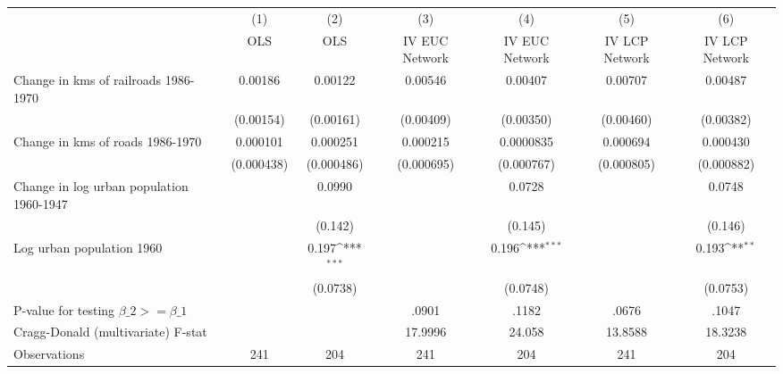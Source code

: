 {
\def\sym#1{\ifmmode^{#1}\else\(^{#1}\)\fi}
\begin{tabular}{l*{6}{c}}
\hline\hline
                &\multicolumn{1}{c}{(1)}&\multicolumn{1}{c}{(2)}&\multicolumn{1}{c}{(3)}&\multicolumn{1}{c}{(4)}&\multicolumn{1}{c}{(5)}&\multicolumn{1}{c}{(6)}\\
                &\multicolumn{1}{c}{OLS}&\multicolumn{1}{c}{OLS}&\multicolumn{1}{c}{IV EUC Network}&\multicolumn{1}{c}{IV EUC Network}&\multicolumn{1}{c}{IV LCP Network}&\multicolumn{1}{c}{IV LCP Network}\\
\hline
Change in kms of railroads 1986-1970&  0.00186         &  0.00122         &  0.00546         &  0.00407         &  0.00707         &  0.00487         \\
                &(0.00154)         &(0.00161)         &(0.00409)         &(0.00350)         &(0.00460)         &(0.00382)         \\
[1em]
Change in kms of roads 1986-1970& 0.000101         & 0.000251         & 0.000215         &0.0000835         & 0.000694         & 0.000430         \\
                &(0.000438)         &(0.000486)         &(0.000695)         &(0.000767)         &(0.000805)         &(0.000882)         \\
[1em]
Change in log urban population 1960-1947&                  &   0.0990         &                  &   0.0728         &                  &   0.0748         \\
                &                  &  (0.142)         &                  &  (0.145)         &                  &  (0.146)         \\
[1em]
Log urban population 1960&                  &    0.197\sym{***}&                  &    0.196\sym{***}&                  &    0.193\sym{**} \\
                &                  & (0.0738)         &                  & (0.0748)         &                  & (0.0753)         \\
\hline
P-value for testing $\beta\_{2} >= \beta\_{1}$&                  &                  &    .0901         &    .1182         &    .0676         &    .1047         \\
Cragg-Donald (multivariate) F-stat&                  &                  &  17.9996         &   24.058         &  13.8588         &  18.3238         \\
Observations    &      241         &      204         &      241         &      204         &      241         &      204         \\
\hline\hline
\end{tabular}
}
